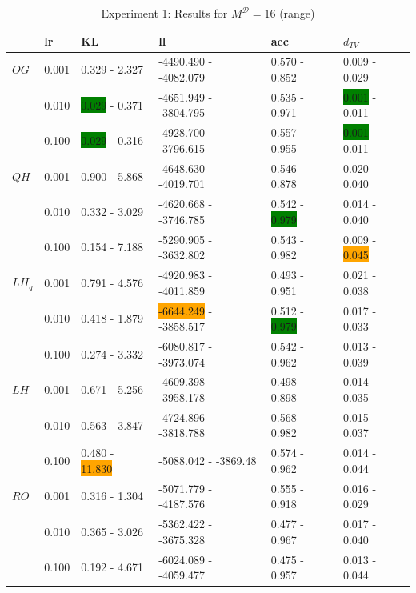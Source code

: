 \documentclass[shortabstract]{iithesis}
\begin{document}
\begin{table}[!ht]
\centering
\caption{Experiment 1: Results for $M^{\mathcal D}=16$ (range)}
\label{tab:res_ex1_16}
\vspace{5mm}
\begin{tabular}{llllll}  \hline
& lr &   KL &                      ll &               acc &              $d_{TV}$ \\ \hline
$OG$ & 0.001 &  0.329 - 2.327 &   -4490.490 - -4082.079 &   0.570 - 0.852 &  0.009 - 0.029 \\
        & 0.010 &  \colorbox{green}{0.029} - 0.371 &  -4651.949 - -3804.795 &  0.535 - 0.971 &  \colorbox{green}{0.001} - 0.011 \\
        & 0.100 &  \colorbox{green}{0.029} - 0.316 &    -4928.700 - -3796.615 &  0.557 - 0.955 &  \colorbox{green}{0.001} - 0.011 \\
$QH$ & 0.001 &    0.900 - 5.868 &   -4648.630 - -4019.701 &  0.546 - 0.878 &    0.020 - 0.040 \\
        & 0.010 &  0.332 - 3.029 &  -4620.668 - -3746.785 &  0.542 - \colorbox{green}{0.979} &   0.014 - 0.040 \\
        & 0.100 &  0.154 - 7.188 &  -5290.905 - -3632.802 &  0.543 - 0.982 &  0.009 - \colorbox{orange}{0.045} \\
$LH_q$ & 0.001 &  0.791 - 4.576 &  -4920.983 - -4011.859 &  0.493 - 0.951 &  0.021 - 0.038 \\
        & 0.010 &  0.418 - 1.879 &  \colorbox{orange}{-6644.249} - -3858.517 &  0.512 - \colorbox{green}{0.979} &  0.017 - 0.033 \\
        & 0.100 &  0.274 - 3.332 &  -6080.817 - -3973.074 &  0.542 - 0.962 &  0.013 - 0.039 \\
$LH$& 0.001 &  0.671 - 5.256 &  -4609.398 - -3958.178 &  0.498 - 0.898 &  0.014 - 0.035 \\
        & 0.010 &  0.563 - 3.847 &  -4724.896 - -3818.788 &  0.568 - 0.982 &  0.015 - 0.037 \\
        & 0.100 &   0.480 - \colorbox{orange}{11.830} &   -5088.042 - -3869.48 &  0.574 - 0.962 &  0.014 - 0.044 \\
$RO$ & 0.001 &  0.316 - 1.304 &  -5071.779 - -4187.576 &  0.555 - 0.918 &  0.016 - 0.029 \\
        & 0.010 &  0.365 - 3.026 &  -5362.422 - -3675.328 &  0.477 - 0.967 &   0.017 - 0.040 \\
        & 0.100 &  0.192 - 4.671 &  -6024.089 - -4059.477 &  0.475 - 0.957 &  0.013 - 0.044 \\

\end{tabular}
\end{table}
\end{document}
